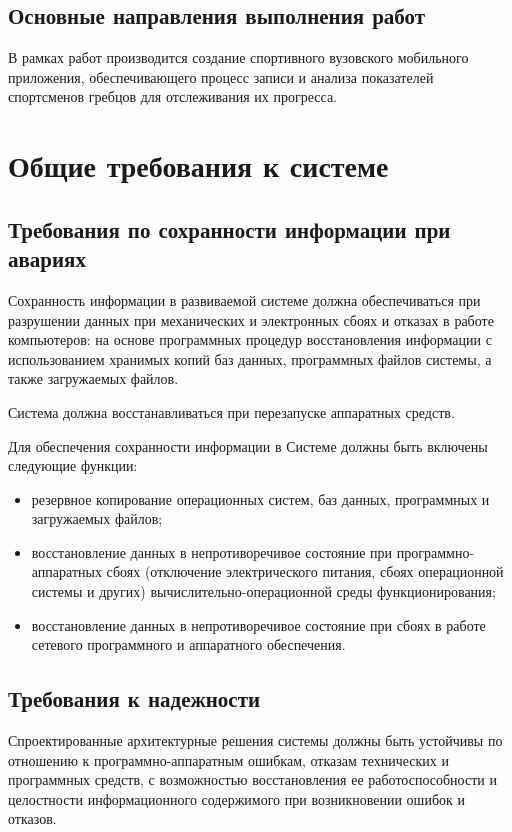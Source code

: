 \documentclass[14pt]{extreport}
\begin{document}
\section{Основные направления выполнения работ}

В рамках работ производится создание спортивного вузовского мобильного приложения, обеспечивающего процесс записи и анализа показателей спортсменов гребцов для отслеживания их прогресса.

\chapter{Общие требования к системе}

\section{Требования по сохранности информации при авариях}

Сохранность информации в развиваемой системе должна обеспечиваться при разрушении данных при механических и электронных сбоях и
отказах в работе компьютеров: на основе программных процедур
восстановления информации с использованием хранимых копий баз данных,
программных файлов системы, а также загружаемых файлов.

Система должна восстанавливаться при перезапуске аппаратных средств.

Для обеспечения сохранности информации в Системе должны быть
включены следующие функции:
\begin{itemize}
\item резервное копирование операционных систем, баз данных,
программных и загружаемых файлов;
\item восстановление данных в непротиворечивое состояние при
программно-аппаратных сбоях (отключение электрического питания, сбоях
операционной системы и других) вычислительно-операционной среды
функционирования;
\item	восстановление данных в непротиворечивое состояние при сбоях в
работе сетевого программного и аппаратного обеспечения.
\end{itemize}

\section{Требования к надежности}

Спроектированные архитектурные решения системы должны быть
устойчивы по отношению к программно-аппаратным ошибкам, отказам
технических и программных средств, с возможностью восстановления ее
работоспособности и целостности информационного содержимого при
возникновении ошибок и отказов.
\end{document}
